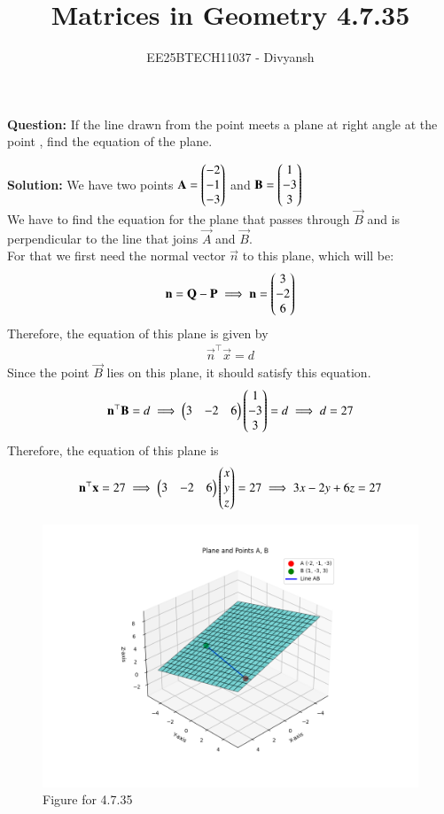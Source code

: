 \documentclass[journal,12pt,onecolumn]{IEEEtran}
\title{Matrices in Geometry 4.7.35}
\author{EE25BTECH11037 - Divyansh}
\theoremstyle{remark}
\begin{document}
\vspace{3cm}
\maketitle
{\let\newpage\relax\maketitle}
\textbf{Question: }
If the line drawn from the point  meets a plane at right angle at the point , find the equation of the plane.
\vspace{2mm}

\textbf{Solution:}
 \vspace{1mm}
We have two points $\mathbf{A}=\begin{pmatrix}-2\\ -1 \\ -3\end{pmatrix}$ and $\mathbf{B}=\begin{pmatrix}1\\  -3\\ 3\end{pmatrix}$\\
We have to find the equation for the plane that passes through $\vec{B}$ and is perpendicular to the line that joins $\vec{A}$ and $\vec{B}$.\\
For that we first need the normal vector $\vec{n}$ to this plane, which will be:
\begin{align}
    \mathbf{n}=\mathbf{Q}-\mathbf{P} \implies \mathbf{n} =\begin{pmatrix}3 \\ -2 \\ 6\end{pmatrix}
\end{align}
Therefore, the equation of this plane is given by 
\begin{align}
    \vec{n}^{\top}\vec{x}=d
\end{align}
Since the point $\vec{B}$ lies on this plane, it should satisfy this equation.
\begin{align}
    \mathbf{n}^{\top}\mathbf{B}=d \implies \begin{pmatrix}3 & -2 & 6\end{pmatrix}\begin{pmatrix}1 \\ -3 \\ 3\end{pmatrix}=d \implies d=27
\end{align}
Therefore, the equation of this plane is 
\begin{align}
    \mathbf{n}^{\top}\mathbf{x}=27 \implies \begin{pmatrix}3 & -2 & 6\end{pmatrix}\begin{pmatrix}x \\ y \\ z\end{pmatrix}=27 \implies 3x - 2y +6z=27
\end{align}
\begin{figure}[H]
    \centering
    \includegraphics[width=1\columnwidth]{figs/1.png}
    \caption{Figure for 4.7.35}
    \label{fig:placeholder}
\end{figure}
\end{document}
